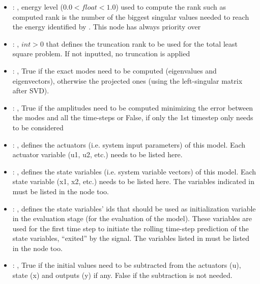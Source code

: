 \begin{itemize}
    \item {}: , 
      energy level ($0.0 < float < 1.0$) used to compute the rank such
      as computed rank is the number of the biggest singular values needed to reach the energy
      identified by                                                    . This
      node has always priority over  

    \item {}: , 
      $int > 0$ that defines the truncation rank to be used for the total
      least square problem. If not inputted, no truncation is applied

    \item {}: , 
      True if the exact modes need to be computed (eigenvalues and
      eigenvectors),   otherwise the projected ones (using the left-singular matrix after SVD).

    \item {}: , 
      True if the amplitudes need to be computed minimizing the error
      between the modes and all the time-steps or False, if only the 1st timestep only needs to be
      considered

    \item {}: , 
      defines the actuators (i.e. system input parameters)
      of this model. Each actuator variable (u1, u2, etc.) needs to
      be listed here.

    \item {}: , 
      defines the state variables (i.e. system variable vectors)
      of this model. Each state variable (x1, x2, etc.) needs to be listed
      here. The variables indicated in  must be
      listed in the  node too.

    \item {}: , 
      defines the state variables' ids  that should be used as
      initialization variable                                                   in the evaluation
      stage (for the evaluation of the model).
      These variables are used for the first time step to initiate
      the rolling time-step prediction of the state variables, ``exited''
      by the  signal. The variables listed in
       must be listed in the  
      node too.

    \item {}: , 
      True if the initial values need to be subtracted from the
      actuators (u), state (x) and outputs (y) if any. False if the subtraction
      is not needed.
  \end{itemize}

